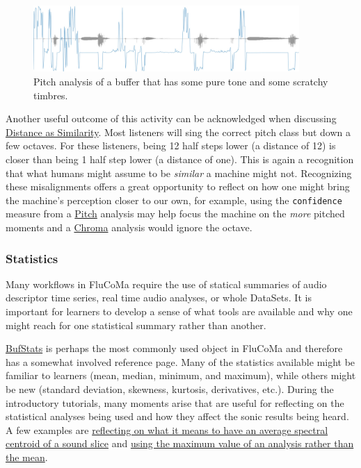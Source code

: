 \documentclass{article}
\begin{document}
\begin{figure}[H]
\centering
\includegraphics[width=0.9\textwidth]{./figures/pitch-analysis.jpg}
\caption{Pitch analysis of a buffer that has some pure tone and some scratchy timbres.}
\label{fig:pitch-analysis}
\end{figure}

Another useful outcome of this activity can be acknowledged when
discussing \href{https://learn.flucoma.org/learn/why-scale/}{Distance as
Similarity}. Most listeners will sing the correct pitch class but down a
few octaves. For these listeners, being 12 half steps lower (a distance
of 12) is closer than being 1 half step lower (a distance of one). This
is again a recognition that what humans might assume to be
\emph{similar} a machine might not. Recognizing these misalignments offers a great opportunity to reflect on how one might bring the machine's perception closer to our own, for example, using the \texttt{confidence} measure from a \href{https://learn.flucoma.org/reference/pitch/}{Pitch} analysis may help focus the machine on the \textit{more} pitched moments and a 
\href{https://learn.flucoma.org/reference/chroma/}{Chroma} analysis would ignore the octave.

\subsubsection{Statistics}

Many workflows in FluCoMa require the use of statical summaries of audio descriptor time series, real time audio analyses, or whole DataSets. It is important for
learners to develop a sense of what tools are available and why one
might reach for one statistical summary rather than another.

\href{https://learn.flucoma.org/reference/bufstats/}{BufStats} is
perhaps the most commonly used object in FluCoMa and therefore has a
somewhat involved reference page. Many of the statistics available might
be familiar to learners (mean, median, minimum, and maximum), while
others might be new (standard deviation, skewness, kurtosis,
derivatives, etc.). During the introductory tutorials, many moments arise that are useful for reflecting on the statistical analyses being used and how they affect the sonic results being heard. A few examples are
\href{https://youtu.be/sabA8p8Y-Xs?t=1311}{reflecting on what it means
to have an average spectral centroid of a sound slice} and
\href{https://youtu.be/qom6x1u4_6A?t=1437}{using the maximum value of an
analysis rather than the mean}.
\end{document}
